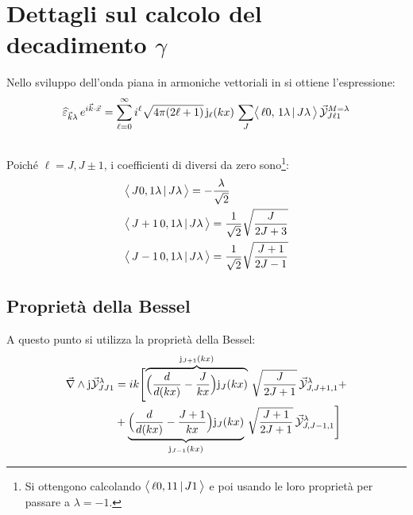 \section{Dettagli sul calcolo del decadimento $\gamma$}\label{compl-passaggi}
Nello sviluppo dell'onda piana in armoniche vettoriali in  si ottiene l'espressione:
$$\widehat{\varepsilon}_{\vec{k}\lambda}\, e^{i\vec{k}\cdot\vec{x}} = \sum_{\ell=0}^\infty i^\ell \sqrt{4\pi(2\ell+1)}\, \mathrm{j}_\ell (kx) \, \sum_J \bigl\langle\, \ell 0 ,\, 1\lambda\, |\, J\lambda\, \bigr\rangle\, \vec{\mathcal{Y}}^{M=\lambda}_{J\ell 1}$$
\subsection{\CG}
Poiché $\ell = J, J\pm 1$, i coefficienti di \CG diversi da zero sono\footnote{Si ottengono calcolando $\bigl\langle\, \ell 0, 1 1\, |\, J1\, \bigr\rangle$ e poi usando le loro proprietà per passare a $\lambda = -1$.}:
\begin{align*}
	&\bigl\langle\, J0,1\lambda\, |\, J\lambda\, \bigr\rangle = - \frac{\lambda}{\sqrt{2}}\\
	&\bigl\langle\, J+1\,0,1\lambda\, |\, J\lambda\, \bigr\rangle = \frac{1}{\sqrt{2}} \sqrt{\frac{J}{2J+3}}\\
	&\bigl\langle\, J-1\,0,1\lambda\, |\, J\lambda\, \bigr\rangle = \frac{1}{\sqrt{2}} \sqrt{\frac{J+1}{2J-1}}
\end{align*}
\subsection{Proprietà della Bessel}
A questo punto si utilizza la proprietà della Bessel:
\begin{align*}
	\vec{\nabla}\land\mathrm{j}\vec{\mathcal{Y}}_{JJ1}^\lambda &= ik \Biggl [ \overbrace{\Bigl ( \frac{d}{d(kx)} - \frac{J}{kx} \Bigr ) \mathrm{j}_{J}(kx) }^{\mathrm{j}_{J+1}(kx)}\, \sqrt{\frac{J}{2J+1}}\, \vec{\mathcal{Y}}_{J,J+1,1}^\lambda + \\
	&+ \underbrace{\Bigl ( \frac{d}{d(kx)} - \frac{J+1}{kx} \Bigr ) \mathrm{j}_{J}(kx) }_{\mathrm{j}_{J-1}(kx)}\, \sqrt{\frac{J+1}{2J+1}}\, \vec{\mathcal{Y}}_{J,J-1,1}^\lambda \Biggr ]
\end{align*}
